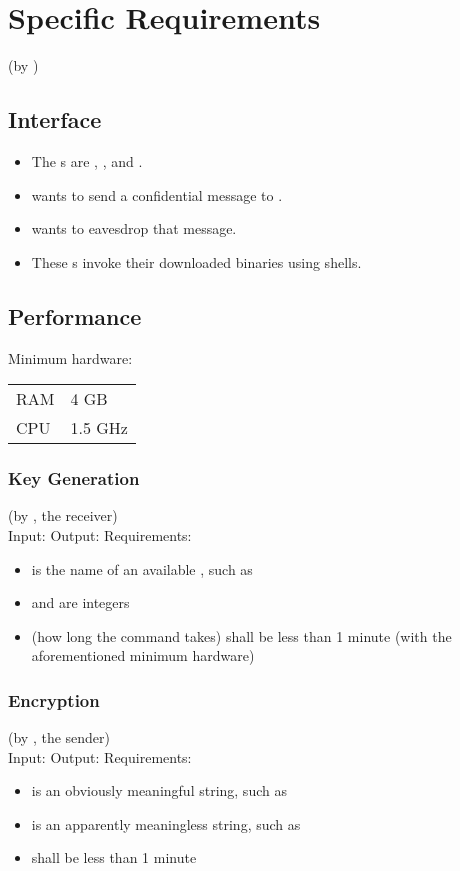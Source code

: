 \section{Specific Requirements}
(by \vp)


\subsection{Interface}

\begin{itemize}
\item The \eu s are \alice, \bob, and \eve.
\item \alice{} wants to send a confidential message to \bob.
\item \eve{} wants to eavesdrop that message.
\item These \eu s invoke their downloaded \cry{} binaries
  using \cl{} shells.
\end{itemize}


\subsection{Performance}

Minimum hardware: \\ \medskip
\begin{tabular}{l|l}
RAM & 4 GB \\
CPU & 1.5 GHz
\end{tabular}

\subsubsection{Key Generation}
(by \bob, the receiver) \\ \medskip
Input: \generatekeysin
Output: \generatekeysout
Requirements:
\begin{itemize}
\item \csarg{} is the name of an available \cs, such as 
\item \publickeyarg{} and \privatekeyarg{} are integers
\item \generatekeystime{} (how long the command takes)
  shall be less than 1 minute
  (with the aforementioned minimum hardware)
\end{itemize}

\subsubsection{Encryption}
(by \alice, the sender)  \\ \medskip
Input: \encryptin
Output: \encryptout
Requirements:
\begin{itemize}
\item \plaintextarg{} is an obviously meaningful string,
  such as \plaintextex
\item \ciphertextarg{} is an apparently meaningless string,
  such as \ciphertextex
\item \encrypttime{} shall be less than 1 minute
\end{itemize}

